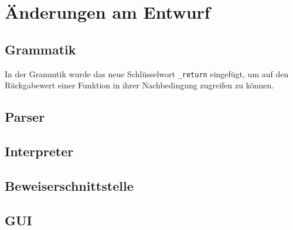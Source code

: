 \section{Änderungen am Entwurf}
\subsection{Grammatik}
In der Grammtik wurde das neue Schlüsselwort \texttt{\_return} eingefügt, um auf den Rückgabewert einer Funktion in ihrer Nachbedingung zugreifen zu können.

\subsection{Parser}
\subsection{Interpreter}
\subsection{Beweiserschnittstelle}
\subsection{GUI}
